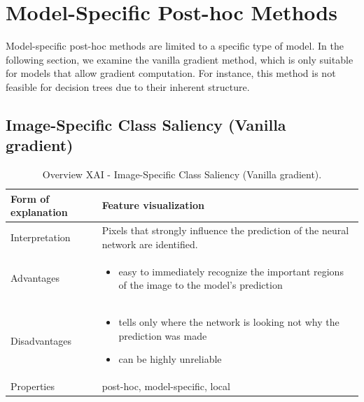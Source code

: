
\newpage
\section{Model-Specific Post-hoc Methods}\label{sec:5}

Model-specific post-hoc methods are limited to a specific type of model. In the following section, we examine the vanilla gradient method, which is only suitable for models that allow gradient computation. For instance, this method is not feasible for decision trees due to their inherent structure.

\subsection*{Image-Specific Class Saliency (Vanilla gradient)}

\begin{table}[H]
  \centering
  \begin{tabular}{|p{}|p{}|}
    \hline
    Form of \newline explanation & 
    Feature visualization \\
    
    \hline
    Interpretation & 
    Pixels that strongly influence the prediction of the neural network are identified. \\
    \hline
    Advantages &
    \begin{itemize}[nosep, left=0em]
        \item easy to immediately recognize the important regions of the image to the model's prediction
    \end{itemize} \\
    
    \hline
    Disadvantages &
    \begin{itemize}[nosep, left=0em]
        \item tells only where the network is looking not why the prediction was made
        \item can be highly unreliable
    \end{itemize} \\
    
    \hline
    Properties & 
    post-hoc, model-specific, local  \\
    
    \hline
  \end{tabular}
  \caption[Overview XAI - Image-Specific Class Saliency (Vanilla gradient)]{Overview XAI - Image-Specific Class Saliency (Vanilla gradient).}
  \label{tab:VanillaGradient}
\end{table}

